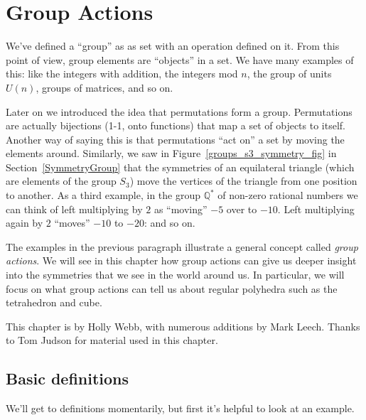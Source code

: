 \chapter{Group Actions }\label{actions}
We've defined a  ``group'' as as set with an operation defined on it.  From this point of view, group elements are ``objects'' in a set. We have many examples of this: like the integers with addition, the integers mod $n$, the group of units $U(n)$, groups of matrices, and so on.

Later on we introduced the idea that permutations form a group. Permutations are actually bijections (1-1, onto functions) that map a set of objects to itself.  Another way of saying this is that permutations ``act on'' a set by moving the elements around.  Similarly, we saw in Figure~\ref{groups_s3_symmetry_fig} in Section~\ref{SymmetryGroup} that the symmetries of an equilateral triangle (which are elements of the group $S_3$) move the vertices of the triangle from one position to another.  As a third example, in the group $\mathbb {Q}^*$ of non-zero rational numbers we can think of left multiplying by $2$ as ``moving''  $-5$ over to $-10$.  Left multiplying again by $2$ ``moves'' $-10$ to $-20$: and so on.   

The examples in the previous paragraph  illustrate a general concept called \emph{group actions}. We will see in this chapter how group actions can give us deeper insight into the symmetries that we see in the world around us. In particular, we will focus on what group actions can tell us about regular polyhedra such as the tetrahedron and cube.
\bigskip

This chapter  is by Holly Webb, with numerous additions by Mark Leech. Thanks to Tom Judson for material used in this chapter.

\section{Basic definitions\quad
{}}
\label{sec:DefActions}

We'll get to definitions momentarily, but first it's helpful to look at an example.

